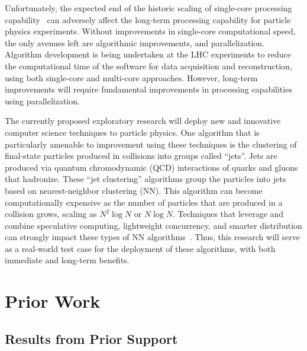 \documentclass[times,11pt]{article}
\begin{document}
Unfortunately, the expected end of the historic scaling of single-core
processing capability~\cite{GAMEOVER} can adversely affect the
long-term processing capability for particle physics
experiments. Without improvements in single-core computational speed,
the only avenues left are algorithmic improvements, and
parallelization. Algorithm development is being undertaken at the LHC
experiments to
reduce the computational time of the software for data acquisition and
reconstruction, using both single-core and multi-core
approaches. However, long-term improvements will require fundamental
improvements in processing capabilities using parallelization. 

The currently proposed exploratory research will deploy new and
innovative computer science techniques to particle physics. 
One algorithm that is particularly amenable to improvement using these
techniques is the clustering of
final-state particles produced in collisions into groups called
``jets''. Jets are produced via quantum chromodynamic (QCD)
interactions of quarks and gluons that hadronize. 
These ``jet clustering'' algorithms group the particles into jets
based on nearest-neighbor clustering (NN). 
This algorithm can become computationally expensive as the number
of particles that are produced in a collision grows, scaling as
$N^2\log{N}$ or $N\log{N}$. Techniques that leverage and combine speculative computing,
lightweight concurrency, and smarter distribution can strongly impact
these types of NN algorithms~\cite{knn_gpu_1,knn_gpu_2,knn_gpu_3,knn-mapreduce-0,knn-mapreduce-1}. 
Thus, this research will serve as a real-world test case
for the deployment of these algorithms, with both immediate and
long-term benefits. 




 
\section{Prior Work}


\subsection{Results from Prior Support}
\end{document}
